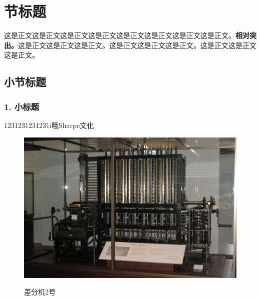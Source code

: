 \section{节标题}
\label{xdtz}

这是正文这是正文这是正文这是正文这是正文这是正文这是正文这是正文。\textcolor{myblue}{\textbf{相对突出。}}这是正文这是正文这是正文。这是正文这是正文这是正文。这是正文这是正文这是正文。

\subsection{小节标题}
\label{computer}



\subsubsection{\textcolor{myblue}{\textbf{1. 小标题 }}}
1231231231231i哦Sharpe文化


\begin{figure}[H]
	\begin{center}
		\includegraphics[width=0.6\columnwidth]{Chapter1/graph/差分机2号.png} \\
	\end{center}
	\vspace{-10pt}
	\caption{差分机2号} \label{fig:fenxiji}
	\vspace{-10pt}
\end{figure}

















